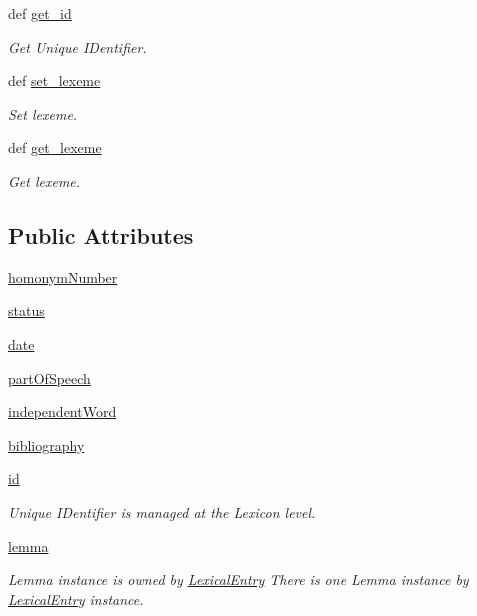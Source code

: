 \begin{DoxyCompactItemize}
def \hyperlink{classsrc_1_1core_1_1lexical__entry_1_1_lexical_entry_a5caac60aebc0855ed5a1522bca0d5f0e}{get\+\_\+id}
\begin{DoxyCompactList}\small\item\em Get Unique I\+Dentifier. \end{DoxyCompactList}\item 
def \hyperlink{classsrc_1_1core_1_1lexical__entry_1_1_lexical_entry_a0dcb24c70fdad0cc4ed49d8c18d7e93d}{set\+\_\+lexeme}
\begin{DoxyCompactList}\small\item\em Set lexeme. \end{DoxyCompactList}\item 
def \hyperlink{classsrc_1_1core_1_1lexical__entry_1_1_lexical_entry_a3a816168935e5601847decc2036cf1ee}{get\+\_\+lexeme}
\begin{DoxyCompactList}\small\item\em Get lexeme. \end{DoxyCompactList}\end{DoxyCompactItemize}
\subsection*{Public Attributes}
\begin{DoxyCompactItemize}
\item 
\hyperlink{classsrc_1_1core_1_1lexical__entry_1_1_lexical_entry_aa7a1e19f555ab214c4c4280fefe84bff}{homonym\+Number}
\item 
\hyperlink{classsrc_1_1core_1_1lexical__entry_1_1_lexical_entry_a661ab019b1e1fde2f86158a566eba3fd}{status}
\item 
\hyperlink{classsrc_1_1core_1_1lexical__entry_1_1_lexical_entry_aaa4dae2afec96335786b54c8d5b5f12e}{date}
\item 
\hyperlink{classsrc_1_1core_1_1lexical__entry_1_1_lexical_entry_a9f7833c971ca31885d3d7383fb394d03}{part\+Of\+Speech}
\item 
\hyperlink{classsrc_1_1core_1_1lexical__entry_1_1_lexical_entry_a93614de55bcf2c644c9c048812e318f8}{independent\+Word}
\item 
\hyperlink{classsrc_1_1core_1_1lexical__entry_1_1_lexical_entry_a9f128ce8e68efcbab65b4163a56ab0dd}{bibliography}
\item 
\hyperlink{classsrc_1_1core_1_1lexical__entry_1_1_lexical_entry_a210b91bf8efc402f897e4a62b9e24341}{id}
\begin{DoxyCompactList}\small\item\em Unique I\+Dentifier is managed at the Lexicon level. \end{DoxyCompactList}\item 
\hyperlink{classsrc_1_1core_1_1lexical__entry_1_1_lexical_entry_a616298be2e81b660fc8e6eccd7c4dcfb}{lemma}
\begin{DoxyCompactList}\small\item\em Lemma instance is owned by \hyperlink{classsrc_1_1core_1_1lexical__entry_1_1_lexical_entry}{Lexical\+Entry} There is one Lemma instance by \hyperlink{classsrc_1_1core_1_1lexical__entry_1_1_lexical_entry}{Lexical\+Entry} instance. \end{DoxyCompactList}\end{DoxyCompactItemize}


